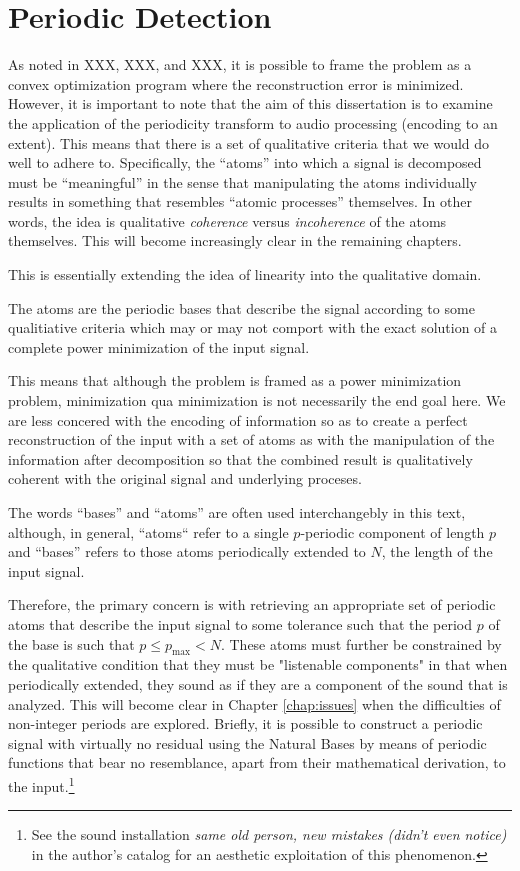 \chapter{Periodic Detection}\label{chapter:detection}

As noted in XXX, XXX, and XXX, it is possible to frame the problem as a convex optimization program where the reconstruction error is minimized. However, it is important to note that the aim of this dissertation is to examine the application of the periodicity transform to audio processing (encoding to an extent). This means that there is a set of qualitative criteria that we would do well to adhere to. Specifically, the ``atoms'' into which a signal is decomposed must be ``meaningful'' in the sense that manipulating the atoms individually results in something that resembles ``atomic processes'' themselves. In other words, the idea is qualitative \emph{coherence} versus \emph{incoherence} of the atoms themselves. This will become increasingly clear in the remaining chapters.

This is essentially extending the idea of linearity into the qualitative domain.

The atoms are the periodic bases that describe the signal according to some qualitiative criteria which may or may not comport with the exact solution of a complete power minimization of the input signal.

This means that although the problem is framed as a power minimization problem, minimization qua minimization is not necessarily the end goal here. We are less concered with the encoding of information so as to create a perfect reconstruction of the input with a set of atoms as with the manipulation of the information after decomposition so that the combined result is qualitatively coherent with the original signal and underlying proceses.

The words ``bases'' and ``atoms'' are often used interchangebly in this text, although, in general, ``atoms`` refer to a single $p$-periodic component of length $p$ and ``bases'' refers to those atoms periodically extended to $N$, the length of the input signal.


Therefore, the primary concern is with retrieving an appropriate set of periodic atoms that describe the input signal to some tolerance such that the period $p$ of the base is such that $p \leq p_{\text{max}} < N$. These atoms must further be constrained by the qualitative condition that they must be "listenable components" in that when periodically extended, they sound as if they are a component of the sound that is analyzed. This will become clear in Chapter \ref{chap:issues} when the difficulties of non-integer periods are explored. Briefly, it is possible to construct a periodic signal with virtually no residual using the Natural Bases by means of periodic functions that bear no resemblance, apart from their mathematical derivation, to the input.\footnote{See the sound installation \emph{same old person, new mistakes (didn't even notice)} in the author's catalog for an aesthetic exploitation of this phenomenon.}

